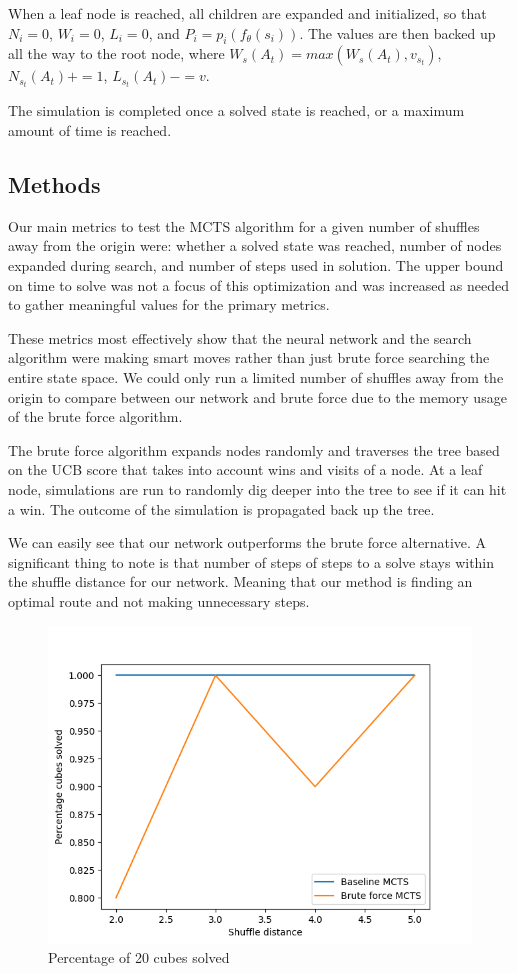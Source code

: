 \documentclass[10pt,twocolumn,letterpaper]{article}
\begin{document}
When a leaf node is reached, all children are expanded and initialized, so that $N_i = 0$, $W_i = 0$, $L_i = 0$, and $P_i = p_i(f_\theta (s_i))$. The values are then backed up all the way to the root node, where $W_s(A_t) = max(W_s(A_t), v_{s_{t}})$, $N_{s_{t}}(A_t)+= 1$, $L_{s_{t}}(A_t) -= v$.

The simulation is completed once a solved state is reached, or a maximum amount of time is reached.

\subsection{Methods}

Our main metrics to test the MCTS algorithm for a given number of shuffles away from the origin were: whether a solved state was reached, number of nodes expanded during search, and number of steps used in solution.  The upper bound on time to solve was not a focus of this optimization and was increased as needed to gather meaningful values for the primary metrics.  

These metrics most effectively show that the neural network and the search algorithm were making smart moves rather than just brute force searching the entire state space.  We could only run a limited number of shuffles away from the origin to compare between our network and brute force due to the memory usage of the brute force algorithm.  

The brute force algorithm expands nodes randomly and traverses the tree based on the UCB score that takes into account wins and visits of a node.  At a leaf node, simulations are run to randomly dig deeper into the tree to see if it can hit a win.  The outcome of the simulation is propagated back up the tree. 

We can easily see that our network outperforms the brute force alternative.  A significant thing to note is that number of steps of steps to a solve stays within the shuffle distance for our network.  Meaning that our method is finding an optimal route and not making unnecessary steps. 

\begin{figure}
  \includegraphics[width=\linewidth]{brute_solved.png}
  \caption{Percentage of 20 cubes solved}
  \label{fig:net}
\end{figure}
\end{document}

